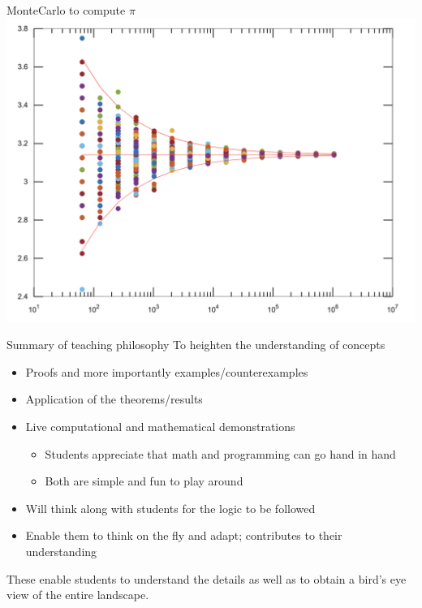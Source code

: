 \documentclass{beamer}
\begin{document}
\begin{frame}{MonteCarlo to compute $\pi$}
	\includegraphics[width=\textwidth]{./images/pi_2.png}
\end{frame}

\begin{frame}{Summary of teaching philosophy}
	\large
	To heighten the understanding of concepts
	\begin{itemize}
		\item
		Proofs and more importantly examples/counterexamples
		\item
		Application of the theorems/results
		\item
		Live computational and mathematical demonstrations
		\begin{itemize}
			\item
			Students appreciate that math and programming can go hand in hand
			\item
			Both are simple and fun to play around
		\end{itemize}
		\pause
		\item
		Will think along with students for the logic to be followed
		\item
		Enable them to think on the fly and adapt; contributes to their understanding
	\end{itemize}
	These enable students to understand the details as well as to obtain a bird's eye view of the entire landscape.
\end{frame}
\end{document}
